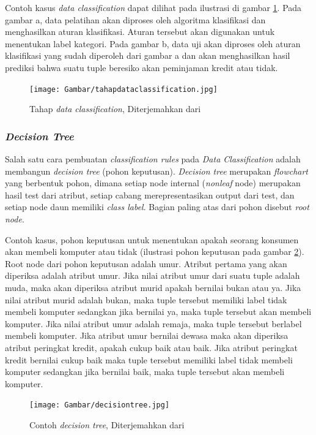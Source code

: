 Contoh kasus \textsl{data classification} dapat dilihat pada ilustrasi di gambar \ref{fig:tahapDataClassification}. Pada gambar a, data pelatihan akan diproses oleh algoritma klasifikasi dan menghasilkan aturan klasifikasi. Aturan tersebut akan digunakan untuk menentukan label kategori. Pada gambar b, data uji akan diproses oleh aturan klasifikasi yang sudah diperoleh dari gambar a dan akan menghasilkan hasil prediksi bahwa suatu tuple beresiko akan peminjaman kredit atau tidak.

\begin{figure}
\centering
\texttt{[image: Gambar/tahapdataclassification.jpg]}
\caption[Tahap \textsl{data classification}]{Tahap \textsl{data classification}, Diterjemahkan dari \cite{DM}} 
\label{fig:tahapDataClassification}
\end{figure}

\subsubsection{\textsl{Decision Tree}}
Salah satu cara pembuatan \textsl{classification rules} pada \textsl{Data Classification} adalah membangun \textsl{decision tree} (pohon keputusan). \textsl{Decision tree} merupakan \textsl{flowchart} yang berbentuk pohon, dimana setiap node internal (\textsl{nonleaf} node) merupakan hasil test dari atribut, setiap cabang merepresentasikan output dari test, dan setiap node daun memiliki \textsl{class label}. Bagian paling atas dari pohon disebut \textsl{root node}. 

Contoh kasus, pohon keputusan untuk menentukan apakah seorang konsumen akan membeli komputer atau tidak (ilustrasi pohon keputusan pada gambar \ref{fig:decisionTree}). Root node dari pohon keputusan adalah umur. Atribut pertama yang akan diperiksa adalah atribut umur. Jika nilai atribut umur dari suatu tuple adalah muda, maka akan diperiksa atribut murid apakah bernilai bukan atau ya. Jika nilai atribut murid adalah bukan, maka tuple tersebut memiliki label tidak membeli komputer sedangkan jika bernilai ya, maka tuple tersebut akan membeli komputer. Jika nilai atribut umur adalah remaja, maka tuple tersebut berlabel membeli komputer. Jika atribut umur bernilai dewasa maka akan diperiksa atribut peringkat kredit, apakah cukup baik atau baik. Jika atribut peringkat kredit bernilai cukup baik maka tuple tersebut memiliki label tidak membeli komputer sedangkan jika bernilai baik, maka tuple tersebut akan membeli komputer.

\begin{figure}
\centering
\texttt{[image: Gambar/decisiontree.jpg]}
\caption[Contoh \textsl{decision tree}]{Contoh \textsl{decision tree}, Diterjemahkan dari \cite{DM}} 
\label{fig:decisionTree}
\end{figure}

